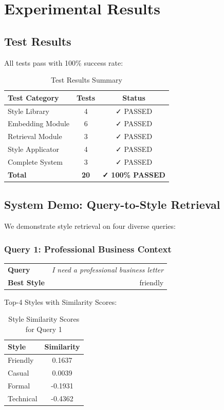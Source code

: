 \documentclass[11pt,a4paper]{article}
\begin{document}
\section{Experimental Results}

\subsection{Test Results}

All tests pass with 100\% success rate:

\begin{table}[H]
\centering
\begin{tabular}{|l|c|c|}
\toprule
\textbf{Test Category} & \textbf{Tests} & \textbf{Status} \\
\midrule
Style Library & 4 & ✓ PASSED \\
Embedding Module & 6 & ✓ PASSED \\
Retrieval Module & 3 & ✓ PASSED \\
Style Applicator & 4 & ✓ PASSED \\
Complete System & 3 & ✓ PASSED \\
\midrule
\textbf{Total} & \textbf{20} & \textbf{✓ 100\% PASSED} \\
\bottomrule
\end{tabular}
\caption{Test Results Summary}
\end{table}

\subsection{System Demo: Query-to-Style Retrieval}

We demonstrate style retrieval on four diverse queries:

\subsubsection{Query 1: Professional Business Context}

\begin{table}[H]
\centering
\begin{tabular}{|l|r|}
\toprule
\textbf{Query} & \textit{I need a professional business letter} \\
\textbf{Best Style} & friendly \\
\bottomrule
\end{tabular}
\end{table}

Top-4 Styles with Similarity Scores:
\begin{table}[H]
\centering
\begin{tabular}{|l|c|}
\toprule
\textbf{Style} & \textbf{Similarity} \\
\midrule
Friendly & 0.1637 \\
Casual & 0.0039 \\
Formal & -0.1931 \\
Technical & -0.4362 \\
\bottomrule
\end{tabular}
\caption{Style Similarity Scores for Query 1}
\end{table}
\end{document}
